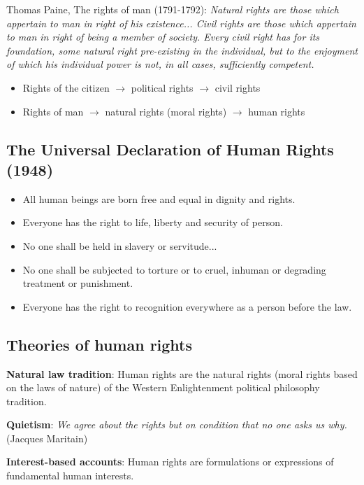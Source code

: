 Thomas Paine, The rights of man (1791-1792):
\textit{Natural rights are those which appertain to man in right of his
existence... Civil rights are those which appertain to man in right of being
a member of society. Every civil right has for its foundation, some natural
right pre-existing in the individual, but to the enjoyment of which his
individual power is not, in all cases, sufficiently competent.}
\begin{itemize}
    \item Rights of the citizen $\rightarrow$ political rights
    $\rightarrow$ civil rights
    \item Rights of man $\rightarrow$ natural rights (moral rights)
    $\rightarrow$ human rights
\end{itemize}

\subsection{The Universal Declaration of Human Rights (1948)}

\begin{itemize}
    \item All human beings are born free and equal in dignity and rights.
    \item Everyone has the right to life, liberty and security of person.
    \item No one shall be held in slavery or servitude...
    \item No one shall be subjected to torture or to cruel, inhuman or
    degrading treatment or punishment.
    \item Everyone has the right to recognition everywhere as a person before
    the law.
\end{itemize}

\subsection{Theories of human rights}

\textbf{Natural law tradition}: Human rights are the natural rights (moral
rights based on the laws of nature) of the Western Enlightenment political
philosophy tradition.

\textbf{Quietism}: \textit{We agree about the rights but on condition that
no one asks us why.} (Jacques Maritain)

\textbf{Interest-based accounts}: Human rights are formulations or
expressions of fundamental human interests.


